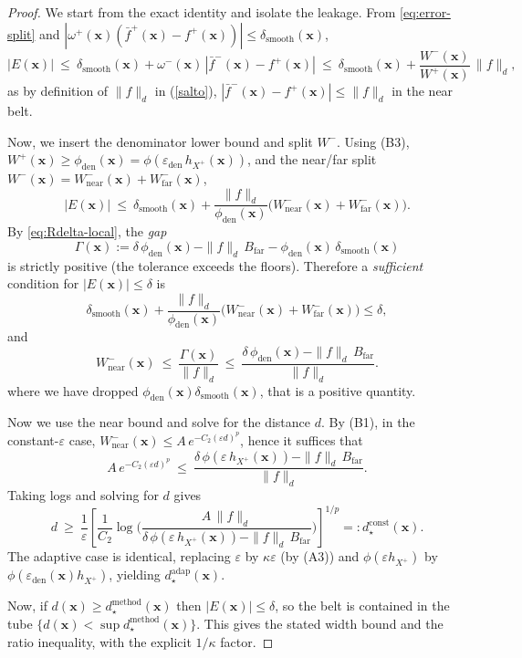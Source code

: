 \documentclass[preprint]{elsarticle}       %
\newtheorem{proof}{Proof}
[section]
\begin{document}
\begin{proof}
We start from the exact identity and isolate the leakage.
From \eqref{eq:error-split} and $|\omega^{+}(\mathbf{x})(\bar f^{+}(\mathbf{x})-f^{+}(\mathbf{x}))|\le \delta_{\mathrm{smooth}}(\mathbf{x})$,
\[
|E(\mathbf{x})|\ \le\ \delta_{\mathrm{smooth}}(\mathbf{x})
+ \omega^{-}(\mathbf{x})\,|\bar f^{-}(\mathbf{x})-f^{+}(\mathbf{x})|
\ \le\ \delta_{\mathrm{smooth}}(\mathbf{x})
+ \frac{W^{-}(\mathbf{x})}{W^{+}(\mathbf{x})}\,\|f\|_{d},
\]
as by definition of $\|f\|_{d}$ in (\ref{salto}),
$|\bar f^{-}(\mathbf{x})-f^{+}(\mathbf{x})|\le \|f\|_{d}$ in the near belt.

\smallskip
Now, we insert the denominator lower bound and split $W^{-}$.
Using (B3), $W^{+}(\mathbf{x})\ge \phi_{\mathrm{den}}(\mathbf{x})
=\phi(\varepsilon_{\mathrm{den}}\,h_{X^{+}}(\mathbf{x}))$,
and the near/far split $W^{-}(\mathbf{x})=W^{-}_{\mathrm{near}}(\mathbf{x})+W^{-}_{\mathrm{far}}(\mathbf{x})$,
\[
|E(\mathbf{x})|\ \le\ \delta_{\mathrm{smooth}}(\mathbf{x})
+ \frac{\|f\|_{d}}{\phi_{\mathrm{den}}(\mathbf{x})}
\Big(W^{-}_{\mathrm{near}}(\mathbf{x})+W^{-}_{\mathrm{far}}(\mathbf{x})\Big).
\]
\smallskip
By \eqref{eq:Rdelta-local}, the \emph{gap}
\[
\Gamma(\mathbf{x})
:=\delta\,\phi_{\mathrm{den}}(\mathbf{x})
-\|f\|_{d}\,B_{\mathrm{far}}
-\phi_{\mathrm{den}}(\mathbf{x})\,\delta_{\mathrm{smooth}}(\mathbf{x})
\]
is strictly positive (the tolerance exceeds the floors). Therefore a \emph{sufficient} condition for
$|E(\mathbf{x})|\le \delta$ is
\[
  \delta_{\mathrm{smooth}}(\mathbf{x})
+ \frac{\|f\|_{d}}{\phi_{\mathrm{den}}(\mathbf{x})}
\Big(W^{-}_{\mathrm{near}}(\mathbf{x})+W^{-}_{\mathrm{far}}(\mathbf{x})\Big)\le\delta,
\]
and
\[
W^{-}_{\mathrm{near}}(\mathbf{x})\ \le\ \frac{\Gamma(\mathbf{x})}{\|f\|_{d}}
\ \le\ \frac{\delta\,\phi_{\mathrm{den}}(\mathbf{x})-\|f\|_{d}\,B_{\mathrm{far}}}{\|f\|_{d}}.
\]
where we have dropped $\phi_{\mathrm{den}}(\mathbf{x})\delta_{\mathrm{smooth}}(\mathbf{x})$, that is a positive quantity.

\smallskip
Now we use the near bound and solve for the distance $d$. By (B1), in the constant-$\varepsilon$ case,
$W^{-}_{\mathrm{near}}(\mathbf{x})\le A\,e^{-C_2(\varepsilon d)^p}$, hence it suffices that
\[
A\,e^{-C_2(\varepsilon d)^p}
\ \le\
\frac{\delta\,\phi(\varepsilon\,h_{X^{+}}(\mathbf{x}))-\|f\|_{d}\,B_{\mathrm{far}}}{\|f\|_{d}}.
\]
Taking logs and solving for $d$ gives
\[
d\ \ge\
\frac{1}{\varepsilon}\left[
\frac{1}{C_2}\log\!\Big(
\frac{A\,\|f\|_{d}}{
\delta\,\phi(\varepsilon\,h_{X^{+}}(\mathbf{x}))-\|f\|_{d}\,B_{\mathrm{far}}}
\Big)\right]^{\!1/p}
=:d_{\star}^{\mathrm{const}}(\mathbf{x}).
\]
The adaptive case is identical, replacing $\varepsilon$ by $\kappa\varepsilon$ (by (A3)) and
$\phi(\varepsilon h_{X^{+}})$ by $\phi(\varepsilon_{\mathrm{den}}(\mathbf{x}) h_{X^{+}})$, yielding
$d_{\star}^{\mathrm{adap}}(\mathbf{x})$.

\smallskip

Now, if $d(\mathbf{x})\ge d_{\star}^{\mathrm{method}}(\mathbf{x})$ then $|E(\mathbf{x})|\le \delta$, so the belt
is contained in the tube $\{d(\mathbf{x})<\sup d_{\star}^{\mathrm{method}}(\mathbf{x})\}$. This gives the
stated width bound and the ratio inequality, with the explicit $1/\kappa$ factor.
\end{proof}
\end{document}
